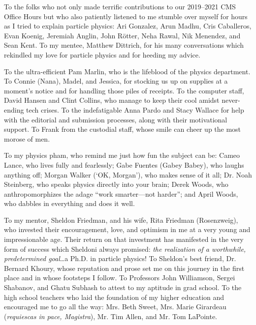 To the folks who not only made terrific contributions to our 2019--2021 CMS Office Hours but who also patiently listened to me stumble over myself for hours as I tried to explain particle physics:
Ari Gonzalez, Arun Madhu, Cris Caballeros, Evan Koenig, Jeremiah Anglin, John Rötter, Neha Rawal, Nik Menendez, and Sean Kent.
To my mentee, Matthew Dittrich, for his many conversations which rekindled my love for particle physics and for heeding my advice.

To the ultra-efficient Pam Marlin, who is the lifeblood of the physics department.
To Connie (Nana), Madel, and Jessica, for stocking us up on supplies at a moment's notice and for handling those piles of receipts.
To the computer staff, David Hansen and Clint Collins, who manage to keep their cool amidst never-ending tech crises.
To the indefatigable Anna Pardo and Stacy Wallace for help with the editorial and submission processes, along with their motivational support.
To Frank from the custodial staff, whose smile can cheer up the most morose of men.

To my physics pham, who remind me just how fun the subject can be:
Cameo Lance, who lives fully and fearlessly;
Gabe Fuentes (Gabey Babey), who laughs anything off;
Morgan Walker (`OK, Morgan'), who makes sense of it all;
Dr. Noah Steinberg, who speaks physics directly into your brain;
Derek Woods, who anthropomorphizes the adage ``work smarter---not harder'';
and April Woods, who dabbles in everything and does it well.

To my mentor, Sheldon Friedman, and his wife, Rita Friedman (Rosenzweig), who invested their encouragement, love, and optimism in me at a very young and impressionable age.
Their return on that investment has manifested in the very form of success which Sheldoni always promised: \emph{the realization of a worthwhile, predetermined goal}\ldots a Ph.D. in particle physics!
To Sheldon's best friend, Dr. Bernard Khoury, whose reputation and prose set me on this journey in the first place and in whose footsteps I follow.
To Professors John Williamson, Sergei Shabanov, and Ghatu Subhash to attest to my aptitude in grad school.
To the high school teachers who laid the foundation of my higher education and encouraged me to go all the way: Mrs. Beth Sweet, Mrs. Marie Girardeau (\emph{requiescas in pace, Magistra}),  Mr. Tim Allen, and Mr. Tom LaPointe.

